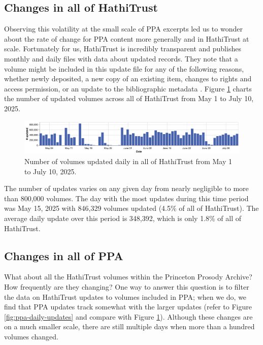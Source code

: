 \documentclass{anthology-ch}         %
\begin{document}
\subsection{Changes in all of HathiTrust}

Observing this volatility at the small scale of PPA excerpts led us to wonder about the rate of change for PPA content more generally and in HathiTrust at scale. Fortunately for us, HathiTrust is incredibly transparent and publishes monthly and daily files with data about updated records. They note that a volume might be included in this update file for any of the following reasons, whether newly deposited, a new copy of an existing item, changes to rights and access permission, or an update to the bibliographic metadata \cite{noauthor_hathifiles_nodate}.  Figure \ref{fig:hathi-daily-updates} charts the number of updated volumes across all of HathiTrust from May 1 to July 10, 2025.
\begin{figure}[t!]
    \centering
    \includegraphics[width=1\linewidth]{figures/hathitrust_changes_countonly.pdf}
    \caption{Number of volumes updated daily in all of HathiTrust from May 1 to July 10, 2025.}
    \label{fig:hathi-daily-updates}
\end{figure}
The number of updates varies on any given day from nearly negligible to more than 800,000 volumes. The day with the most updates during this time period was May 15, 2025 with 846,329 volumes updated (4.5\% of all of HathiTrust). The average daily update over this period is 348,392, which is only 1.8\% of all of HathiTrust.

\subsection{Changes in all of PPA}

What about all the HathiTrust volumes within the Princeton Prosody Archive? How frequently are they changing? One way to answer this question is to filter the data on HathiTrust updates to volumes included in PPA; when we do, we find that PPA updates track somewhat with the larger updates (refer to Figure \ref{fig:ppa-daily-updates} and compare with Figure \ref{fig:hathi-daily-updates}). Although these changes are on a much smaller scale, there are still multiple days when more than a hundred volumes changed.
\end{document}

